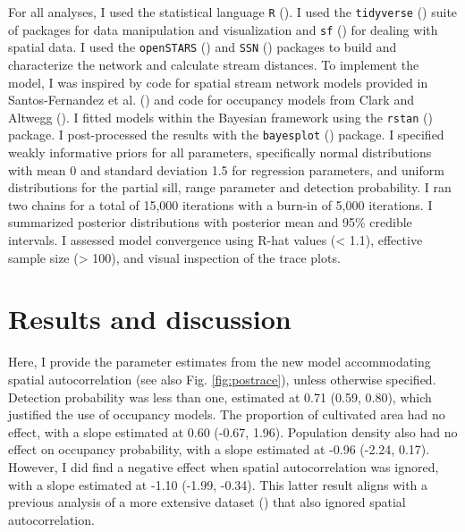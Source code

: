 \documentclass[
  11pt,
  a4paper,
]{article}
\begin{document}
For all analyses, I used the statistical language \texttt{R} (). I used the \texttt{tidyverse} () suite of packages for data manipulation and visualization and \texttt{sf} () for dealing with spatial data. I used the \texttt{openSTARS} () and \texttt{SSN} () packages to build and characterize the network and calculate stream distances. To implement the model, I was inspired by code for spatial stream network models provided in Santos-Fernandez et al. () and code for occupancy models from Clark and Altwegg (). I fitted models within the Bayesian framework using the \texttt{rstan} () package. I post-processed the results with the \texttt{bayesplot} () package. I specified weakly informative priors for all parameters, specifically normal distributions with mean 0 and standard deviation 1.5 for regression parameters, and uniform distributions for the partial sill, range parameter and detection probability. I ran two chains for a total of 15,000 iterations with a burn-in of 5,000 iterations. I summarized posterior distributions with posterior mean and 95\% credible intervals. I assessed model convergence using R-hat values (\textless{} 1.1), effective sample size (\textgreater{} 100), and visual inspection of the trace plots.

\section{Results and discussion}\label{results-and-discussion}

Here, I provide the parameter estimates from the new model accommodating spatial autocorrelation (see also Fig. \ref{fig:postrace}), unless otherwise specified. Detection probability was less than one, estimated at 0.71 (0.59, 0.80), which justified the use of occupancy models. The proportion of cultivated area had no effect, with a slope estimated at 0.60 (-0.67, 1.96). Population density also had no effect on occupancy probability, with a slope estimated at -0.96 (-2.24, 0.17). However, I did find a negative effect when spatial autocorrelation was ignored, with a slope estimated at -1.10 (-1.99, -0.34). This latter result aligns with a previous analysis of a more extensive dataset () that also ignored spatial autocorrelation.
\end{document}
